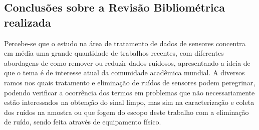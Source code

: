 


\subsection{Conclusões sobre a Revisão Bibliométrica realizada}
Percebe-se que o estudo na área de tratamento de dados de sensores concentra em média uma grande quantidade de trabalhos recentes, com diferentes abordagens de como remover ou reduzir dados ruidosos, apresentando a ideia de que o tema é de interesse atual da comunidade acadêmica mundial. A diversos ramos nos quais tratamento e eliminação de ruídos de sensores podem peregrinar, podendo verificar a ocorrência dos termos em problemas que não necessariamente estão interessados na obtenção do sinal limpo, mas sim na caracterização e coleta dos ruídos na amostra ou que fogem do escopo deste trabalho com a eliminação de ruído, sendo feita através de equipamento físico.
 





